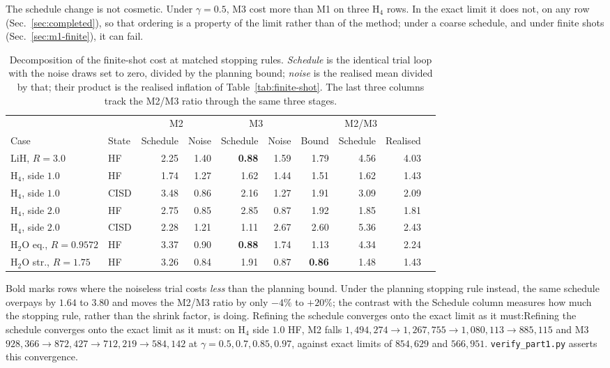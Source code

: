 \documentclass[10pt]{article}
\begin{document}
The schedule change is not cosmetic. Under $\gamma=0.5$, M3 cost more than M1 on
three H$_4$ rows. In the exact limit it does not, on any row
(Sec.~\ref{sec:completed}), so that ordering is a property of the limit rather
than of the method; under a coarse schedule, and under finite shots
(Sec.~\ref{sec:m1-finite}), it can fail.

\begin{table}[!htbp]
\centering
\scriptsize
\caption{Decomposition of the finite-shot cost at matched stopping rules. \emph{Schedule} is the identical trial loop with the noise draws set to zero, divided by the planning bound; \emph{noise} is the realised mean divided by that; their product is the realised inflation of Table~\ref{tab:finite-shot}. The last three columns track the M2/M3 ratio through the same three stages.}
\label{tab:shrink}
\begin{tabular}{llrrrrrrrr}
\toprule
& & \multicolumn{2}{c}{M2} & \multicolumn{2}{c}{M3} & \multicolumn{3}{c}{M2/M3} \\
\cmidrule(lr){3-4}\cmidrule(lr){5-6}\cmidrule(lr){7-9}
Case & State & Schedule & Noise & Schedule & Noise & Bound & Schedule & Realised \\
\midrule
LiH, $R{=}3.0$ & HF & 2.25 & 1.40 & \textbf{0.88} & 1.59 & 1.79 & 4.56 & 4.03 \\
H$_4$, side $1.0$ & HF & 1.74 & 1.27 & 1.62 & 1.44 & 1.51 & 1.62 & 1.43 \\
H$_4$, side $1.0$ & CISD & 3.48 & 0.86 & 2.16 & 1.27 & 1.91 & 3.09 & 2.09 \\
H$_4$, side $2.0$ & HF & 2.75 & 0.85 & 2.85 & 0.87 & 1.92 & 1.85 & 1.81 \\
H$_4$, side $2.0$ & CISD & 2.28 & 1.21 & 1.11 & 2.67 & 2.60 & 5.36 & 2.43 \\
H$_2$O eq., $R{=}0.9572$ & HF & 3.37 & 0.90 & \textbf{0.88} & 1.74 & 1.13 & 4.34 & 2.24 \\
H$_2$O str., $R{=}1.75$ & HF & 3.26 & 0.84 & 1.91 & 0.87 & \textbf{0.86} & 1.48 & 1.43 \\
\bottomrule
\end{tabular}
\end{table}

Bold marks rows where the noiseless trial costs \emph{less} than the planning
bound. Under the planning stopping rule instead, the same schedule overpays by
$1.64$ to $3.80$ and moves the M2/M3 ratio by only $-4\%$ to $+20\%$; the
contrast with the Schedule column measures how much the stopping rule, rather
than the shrink factor, is doing. Refining the schedule converges onto the exact
limit as it must:Refining the schedule converges onto the exact limit as it must: on H$_4$ side
$1.0$ HF, M2 falls $1{,}494{,}274\to1{,}267{,}755\to1{,}080{,}113\to885{,}115$
and M3 $928{,}366\to872{,}427\to712{,}219\to584{,}142$ at
$\gamma=0.5,0.7,0.85,0.97$, against exact limits of $854{,}629$ and $566{,}951$.
\texttt{verify\_part1.py} asserts this convergence.
\end{document}
